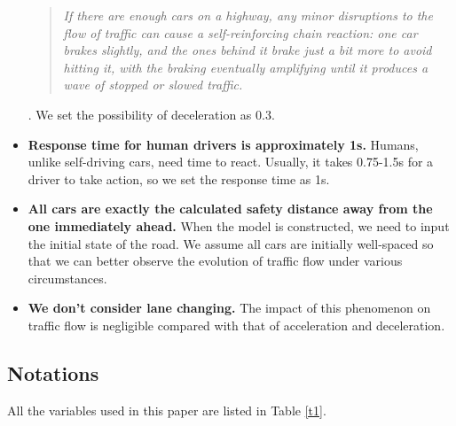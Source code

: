 \documentclass[a4paper]{article}
\begin{document}
\begin{itemize}
{\begin{quote}\textit{If there are enough cars on a highway, any minor disruptions to the flow of traffic can cause a self-reinforcing chain reaction: one car brakes slightly, and the ones behind it brake just a bit more to avoid hitting it, with the braking eventually amplifying until it produces a wave of stopped or slowed traffic.}\cite{phantom}\end{quote}}. We set the possibility of deceleration as 0.3.
\item \textbf{Response time for human drivers is approximately 1s.} Humans, unlike self-driving cars, need time to react. Usually, it takes 0.75-1.5s for a driver to take action, so we set the response time as 1s.
\item \textbf{All cars are exactly the calculated safety distance away from the one immediately ahead.} When the model is constructed, we need to input the initial state of the road. We assume all cars are initially well-spaced so that we can better observe the evolution of traffic flow under various circumstances.
\item \textbf{We don’t consider lane changing.} The impact of this phenomenon on traffic flow is negligible compared with that of acceleration and deceleration.
    \end{itemize}


	\subsection{Notations}
    All the variables used in this paper are listed in Table \ref{t1}.
\end{document}
